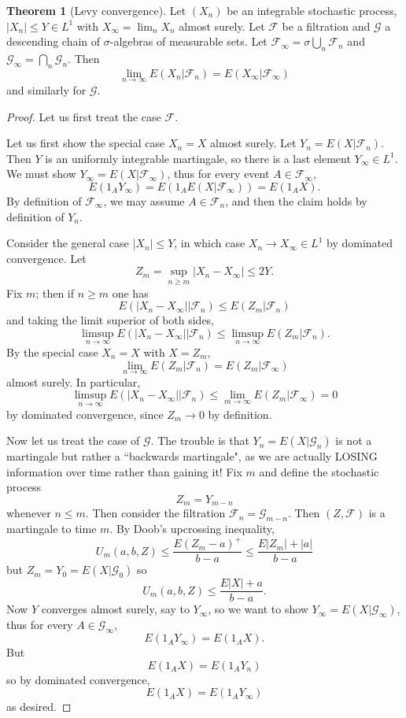 \documentclass[12pt]{book}
\theoremstyle{definition}
\newtheorem{theorem}{Theorem}[chapter]
\begin{document}
\begin{theorem}[Levy convergence]
Let $(X_n)$ be an integrable stochastic process, $|X_n| \leq Y \in L^1$ with $X_\infty = \lim_n X_n$ almost surely.
Let $\mathcal F$ be a filtration and $\mathcal G$ a descending chain of $\sigma$-algebras of measurable sets.
Let $\mathcal F_\infty = \sigma \bigcup_n \mathcal F_n$ and $\mathcal G_\infty = \bigcap_n \mathcal G_n$.
Then
$$\lim_{n \to \infty} E(X_n|\mathcal F_n) = E(X_\infty|\mathcal F_\infty)$$
and similarly for $\mathcal G$.
\end{theorem}
\begin{proof}
Let us first treat the case $\mathcal F$.

Let us first show the special case $X_n = X$ almost surely.
Let $Y_n = E(X|\mathcal F_n)$.
Then $Y$ is an uniformly integrable martingale, so there is a last element $Y_\infty \in L^1$.
We must show $Y_\infty = E(X|\mathcal F_\infty)$, thus for every event $A \in \mathcal F_\infty$,
$$E(1_A Y_\infty) = E(1_A E(X|\mathcal F_\infty)) = E(1_A X).$$
By definition of $\mathcal F_\infty$, we may assume $A \in \mathcal F_n$, and then the claim holds by definition of $Y_n$.

Consider the general case $|X_n| \leq Y$, in which case $X_n \to X_\infty \in L^1$ by dominated convergence.
Let
$$Z_m = \sup_{n \geq m} |X_n - X_\infty| \leq 2Y.$$
Fix $m$; then if $n \geq m$ one has
$$E(|X_n - X_\infty||\mathcal F_n) \leq E(Z_m|\mathcal F_n)$$
and taking the limit superior of both sides,
$$\limsup_{n \to \infty} E(|X_n - X_\infty||\mathcal F_n) \leq \limsup_{n \to \infty} E(Z_m|\mathcal F_n).$$
By the special case $X_n = X$ with $X = Z_m$,
$$\lim_{n \to \infty} E(Z_m|\mathcal F_n) = E(Z_m|\mathcal F_\infty)$$
almost surely.
In particular,
$$\limsup_{n \to \infty} E(|X_n - X_\infty||\mathcal F_n) \leq \lim_{m \to \infty} E(Z_m|\mathcal F_\infty) = 0$$
by dominated convergence, since $Z_m \to 0$ by definition.

Now let us treat the case of $\mathcal G$.
The trouble is that $Y_n = E(X|\mathcal G_n)$ is not a martingale but rather a ``backwards martingale", as we are actually LOSING information over time rather than gaining it!
Fix $m$ and define the stochastic process
$$Z_m = Y_{m - n}$$
whenever $n \leq m$.
Then consider the filtration $\mathcal F_n = \mathcal G_{m - n}$.
Then $(Z, \mathcal F)$ is a martingale to time $m$.
By Doob's upcrossing inequality,
$$U_m(a, b, Z) \leq \frac{E(Z_m - a)^+}{b - a} \leq \frac{E|Z_m| + |a|}{b - a}$$
but $Z_m = Y_0 = E(X|\mathcal G_0)$ so
$$U_m(a, b, Z) \leq \frac{E|X| + a}{b - a}.$$
Now $Y$ converges almost surely, say to $Y_\infty$, so we want to show $Y_\infty = E(X|\mathcal G_\infty)$, thus for every $A \in \mathcal G_\infty$,
$$E(1_A Y_\infty) = E(1_A X).$$
But
$$E(1_A X) = E(1_A Y_n)$$
so by dominated convergence,
$$E(1_A X) = E(1_A Y_\infty)$$
as desired.
\end{proof}
\end{document}
